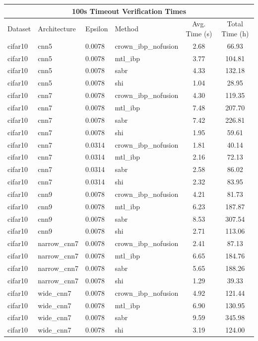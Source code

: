 \begin{tabular}{llllcc}
\toprule
\multicolumn{6}{c}{100s Timeout Verification Times} \\
\midrule
Dataset & Architecture & Epsilon & Method & Avg. Time (s) & Total Time (h) \\
\midrule
cifar10 & cnn5 & 0.0078 & crown\_ibp\_nofusion & 2.68 & 66.93 \\
cifar10 & cnn5 & 0.0078 & mtl\_ibp & 3.77 & 104.81 \\
cifar10 & cnn5 & 0.0078 & sabr & 4.33 & 132.18 \\
cifar10 & cnn5 & 0.0078 & shi & 1.04 & 28.95 \\
cifar10 & cnn7 & 0.0078 & crown\_ibp\_nofusion & 4.30 & 119.35 \\
cifar10 & cnn7 & 0.0078 & mtl\_ibp & 7.48 & 207.70 \\
cifar10 & cnn7 & 0.0078 & sabr & 7.42 & 226.81 \\
cifar10 & cnn7 & 0.0078 & shi & 1.95 & 59.61 \\
cifar10 & cnn7 & 0.0314 & crown\_ibp\_nofusion & 1.81 & 40.14 \\
cifar10 & cnn7 & 0.0314 & mtl\_ibp & 2.16 & 72.13 \\
cifar10 & cnn7 & 0.0314 & sabr & 2.58 & 86.02 \\
cifar10 & cnn7 & 0.0314 & shi & 2.32 & 83.95 \\
cifar10 & cnn9 & 0.0078 & crown\_ibp\_nofusion & 4.21 & 81.73 \\
cifar10 & cnn9 & 0.0078 & mtl\_ibp & 6.23 & 187.87 \\
cifar10 & cnn9 & 0.0078 & sabr & 8.53 & 307.54 \\
cifar10 & cnn9 & 0.0078 & shi & 2.71 & 113.06 \\
cifar10 & narrow\_cnn7 & 0.0078 & crown\_ibp\_nofusion & 2.41 & 87.13 \\
cifar10 & narrow\_cnn7 & 0.0078 & mtl\_ibp & 6.65 & 184.76 \\
cifar10 & narrow\_cnn7 & 0.0078 & sabr & 5.65 & 188.26 \\
cifar10 & narrow\_cnn7 & 0.0078 & shi & 1.29 & 39.33 \\
cifar10 & wide\_cnn7 & 0.0078 & crown\_ibp\_nofusion & 4.92 & 121.44 \\
cifar10 & wide\_cnn7 & 0.0078 & mtl\_ibp & 6.90 & 130.95 \\
cifar10 & wide\_cnn7 & 0.0078 & sabr & 9.59 & 345.98 \\
cifar10 & wide\_cnn7 & 0.0078 & shi & 3.19 & 124.00 \\

\end{tabular}

